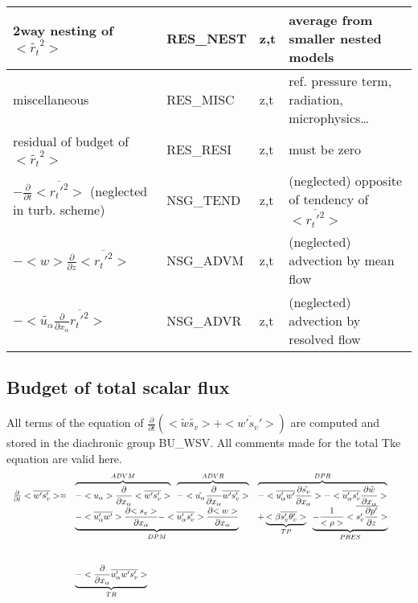 \begin{longtable}[c]{|p{}|p{}|p{}|p{}|}
{\rm 2way nesting of }$<\tilde{r_t}^2>$                                & RES\_NEST  & z,t & average from smaller nested models \\\hline
{\rm miscellaneous}                                                    & RES\_MISC  & z,t & ref. pressure term, radiation, microphysics\ldots \\\hline
{\rm residual of budget of} $<\tilde{r_t}^2>$                          & RES\_RESI  & z,t & must be zero \\\hline
$-\frac{\partial }{\partial t}<\overline{r_t'^2}>$ (neglected in turb. scheme) & NSG\_TEND & z,t & (neglected) opposite of tendency of $<\overline{r_t'^2}>$ \\\hline
$-<w>\frac{\partial}{\partial z}<\overline{r_t'^2}>$                   & NSG\_ADVM  & z,t & (neglected) advection by mean flow\\\hline
$-<\tilde{u_\alpha}\frac{\partial}{\partial x_\alpha}\overline{r_t'^2}>$  & NSG\_ADVR & z,t & (neglected) advection by resolved flow\\\hline
\end{longtable}
\endgroup


\subsection{Budget of total scalar flux}


All terms of the equation of $\frac{\partial}{\partial t} (<\tilde{w}\tilde{s_v}> + <\overline{w's_v'}>)$ are
computed and stored in the diachronic group BU\_WSV. 
All comments made for the total Tke equation are valid here.\\

\begin{displaymath}
\left.
\begin{array}{rllll}
\frac{\partial }{\partial t} <\overline{w's_v'}> = & 
\overbrace{- <u_\alpha>\frac{\partial}{\partial x_\alpha} <\overline{w's_v'}> }^{ADVM} \;\;
\overbrace{- <\tilde{u_\alpha}\frac{\partial}{\partial x_\alpha} \overline{w's_v'} > }^{ADVR} &
\overbrace{- <\overline{u'_\alpha w'} \frac{\partial {\tilde{s_v}}}{\partial x_\alpha}>
- <\overline{u'_\alpha s_v'} \frac{\partial {\tilde{w}}}{\partial x_\alpha}>}^{DPR}&\\
\vspace*{1.0cm}
& \underbrace{- <\overline{u_\alpha'w'}> \frac{\partial {<s_v>}}{\partial x_\alpha}
- <\overline{u'_\alpha s_v'}> \frac{\partial {<w>}}{\partial x_\alpha}}_{DPM}&
+ \underbrace{<\beta  \overline{s_v'\theta'_v}>}_{TP} \;\; \underbrace{- \frac{1}{<\rho>}<\overline{s_v' \frac{\partial p'}{\partial z}}>}_{PRES}&\\
&\underbrace{- <\frac{\partial}{\partial x_\alpha} \overline{u'_\alpha w's_v'}>}_{TR}&&& \\
\end{array}
\right.
\end{displaymath}

